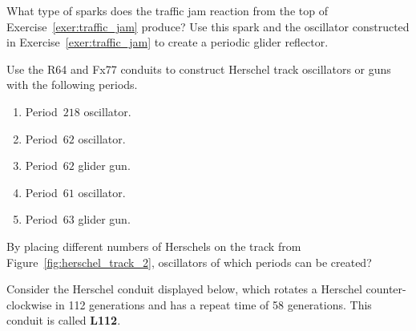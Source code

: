 \begin{multicols}{2}
	
	\mfilbreak
	
	
	\begin{problemstar}\label{exer:traffic_jam_reflect} 
		What type of sparks does the traffic jam reaction from the top of Exercise~\ref{exer:traffic_jam} produce? Use this spark and the oscillator constructed in Exercise~\ref{exer:traffic_jam} to create a periodic glider reflector.
	\end{problemstar}
	
	
	\mfilbreak
	
	
	\begin{problem}\label{exer:herschel_track_1} 
		Use the R64 and Fx77 conduits to construct Herschel track oscillators or guns with the following periods.
		
		\smallskip
		
		\begin{enumerate}[label=\bf\color{ocre}(\alph*)]
			\item Period~$218$ oscillator.
			
			\item Period~$62$ oscillator.
			
			\item Period~$62$ glider gun.
			
			\item Period~$61$ oscillator.
			
			\item Period~$63$ glider gun.
		\end{enumerate}
	\end{problem}
	
	
	\mfilbreak
	
	
	\begin{problem}\label{exer:herschel_track_2_what_periods} 
		By placing different numbers of Herschels on the track from Figure~\ref{fig:herschel_track_2}, oscillators of which periods can be created?
	\end{problem}
	
	
	\mfilbreak
	
	
	\begin{problem}\label{exer:herschel_track_L112}
		Consider the Herschel conduit displayed below, which rotates a Herschel counter-clockwise in 112 generations and has a repeat time of 58 generations. This conduit is called \textbf{L112}.
		
		\begin{center}
		\end{center}
		

\end{problem}
\end{multicols}
